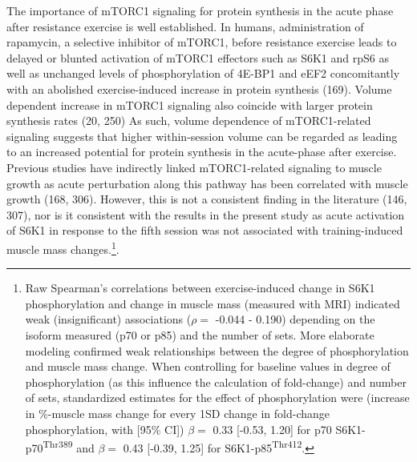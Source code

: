 \documentclass[twoside,10pt]{gihclass} %
\begin{document}
The importance of mTORC1 signaling for protein synthesis in the acute phase after resistance exercise is well established.
In humans, administration of rapamycin, a selective inhibitor of mTORC1, before resistance exercise leads to delayed or blunted activation of mTORC1 effectors such as
S6K1 and rpS6 as well as unchanged levels of phosphorylation of 4E-BP1 and eEF2 concomitantly with an abolished exercise-induced increase in protein synthesis
(169).
Volume dependent increase in mTORC1 signaling also coincide with larger protein synthesis rates
(20, 250)
As such, volume dependence of mTORC1-related signaling suggests that higher within-session volume can be regarded as leading to an increased potential for protein synthesis in the acute-phase after exercise.
Previous studies have indirectly linked mTORC1-related signaling to muscle growth as acute perturbation along this pathway has been correlated with muscle growth
(168, 306).
However, this is not a consistent finding in the literature
(146, 307),
nor is it consistent with the results in the present study as acute activation of S6K1 in response to the fifth session was not associated with training-induced muscle mass changes.\footnote{Raw Spearman's correlations between exercise-induced change in S6K1 phosphorylation and change in muscle mass (measured with MRI) indicated weak (insignificant) associations (\(\rho=\) -0.044 - 0.190) depending on the isoform measured (p70 or p85) and the number of sets. More elaborate modeling confirmed weak relationships between the degree of phosphorylation and muscle mass change. When controlling for baseline values in degree of phosphorylation (as this influence the calculation of fold-change) and number of sets, standardized estimates for the effect of phosphorylation were (increase in \%-muscle mass change for every 1SD change in fold-change phosphorylation, with {[}95\% CI{]}) \(\beta=\) 0.33 {[}-0.53, 1.20{]} for p70 S6K1-p70\textsuperscript{Thr389} and \(\beta=\) 0.43 {[}-0.39, 1.25{]} for S6K1-p85\textsuperscript{Thr412}.}.
\end{document}
